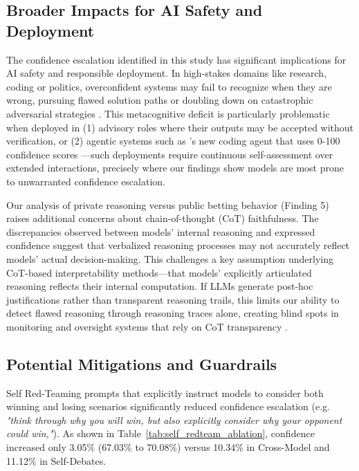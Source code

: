 \documentclass{article}
\begin{document}
\subsection{Broader Impacts for AI Safety and Deployment}

The confidence escalation identified in this study has significant implications for AI safety and responsible deployment. In high-stakes domains like research, coding or politics, overconfident systems may fail to recognize when they are wrong, pursuing flawed solution paths or doubling down on catastrophic adversarial strategies \citep{Rivera_2024}. This metacognitive deficit is particularly problematic when deployed in (1) advisory roles where their outputs may be accepted without verification, or (2) agentic systems such as \citet{cognitionlabs_devin21_2025}'s new coding agent that uses 0-100 confidence scores —such deployments require continuous self-assessment over extended interactions, precisely where our findings show models are most prone to unwarranted confidence escalation.

Our analysis of private reasoning versus public betting behavior (Finding 5) raises additional concerns about chain-of-thought (CoT) faithfulness. The discrepancies observed between models' internal reasoning and expressed confidence suggest that verbalized reasoning processes may not accurately reflect models' actual decision-making. This challenges a key assumption underlying CoT-based interpretability methods—that models' explicitly articulated reasoning reflects their internal computation. If LLMs generate post-hoc justifications rather than transparent reasoning trails, this limits our ability to detect flawed reasoning through reasoning traces alone, creating blind spots in monitoring and oversight systems that rely on CoT transparency \citep{lanham2023measuringfaithfulnesschainofthoughtreasoning,chua2025deepseekr1reasoningmodels}.

\subsection{Potential Mitigations and Guardrails}
Self Red-Teaming prompts that explicitly instruct models to consider both winning and losing scenarios significantly reduced confidence escalation (e.g. \textit{"think through why you will win, but also explicitly consider why your opponent could win,"}). As shown in Table~\ref{tab:self_redteam_ablation}, confidence increased only 3.05\% (67.03\% to 70.08\%) versus 10.34\% in Cross-Model and 11.12\% in Self-Debates.
\end{document}
